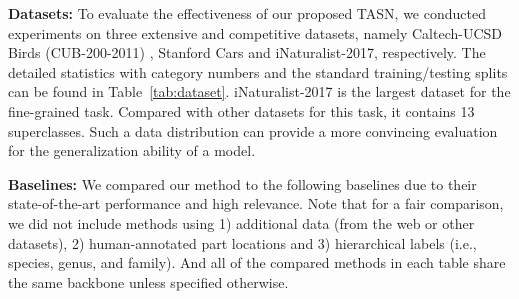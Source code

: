 \documentclass[10pt,twocolumn,letterpaper]{article}
\begin{document}
\begin{table}
{\small
\caption{Detailed statistics of the three datasets used in this paper.}
\label{tab:dataset}
\begin{center}
\end{center}
}
\vspace{-7 mm}
\end{table}


\textbf{Datasets:} To evaluate the effectiveness of our proposed TASN, we conducted experiments on three extensive and competitive datasets, namely Caltech-UCSD Birds (CUB-200-2011) \cite{CUB-200-2011},  Stanford Cars \cite{StanfordCar} and iNaturalist-2017\cite{van2018inaturalist}, respectively. The detailed statistics with category numbers and the standard training/testing splits can be found in Table~\ref{tab:dataset}. iNaturalist-2017 is the largest dataset for the fine-grained task. Compared with other datasets for this task, it contains 13 superclasses. Such a data distribution can provide a more convincing evaluation for the generalization ability of a model.

\textbf{Baselines:}
We compared our method to the following baselines due to their state-of-the-art performance and high relevance. Note that for a fair comparison, we did not include methods using 1) additional data (from the web or other datasets), 2) human-annotated part locations and 3) hierarchical labels (i.e., species, genus, and family). And all of the compared methods in each table share the same backbone unless specified otherwise.
\end{document}
